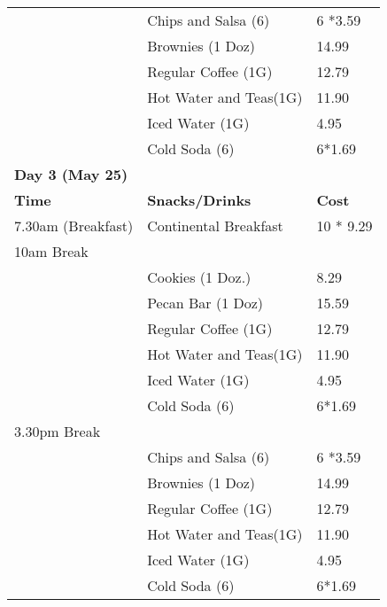 \documentclass[10pt]{article}
\begin{document}
\begin{table}[htp]
{\begin{tabular}{lll}
		&	    Chips and Salsa (6) &   6 *3.59  \\	
	    &			Brownies (1 Doz)  & 14.99 \\
		& 	    Regular Coffee (1G) & 12.79 \\
		& 	    Hot Water and Teas(1G) & 11.90  \\
         &        Iced Water (1G)& 4.95 \\
		& 	    Cold Soda  (6) & 6*1.69	 \\ \hline
\multicolumn{3}{l}{\textbf{Day 3 (May 25)}}\\ \hline
\textbf{Time}  &  \textbf{Snacks/Drinks} & \textbf{Cost} \\ \hline
7.30am (Breakfast)  &    Continental Breakfast  & 10 * 9.29  \\ \hline
10am Break   &    & \\
        &      Cookies (1 Doz.) &  8.29 \\
        &      Pecan Bar (1 Doz)  &  15.59 \\
		&	   Regular Coffee (1G) & 12.79 \\
		&	   Hot Water and Teas(1G) & 11.90 \\ 
        &       Iced Water (1G)& 4.95 \\
		&	   Cold Soda  (6) & 6*1.69	 \\\hline
3.30pm Break &  & \\
		&	    Chips and Salsa (6)  & 6 *3.59 	 \\
		&		Brownies (1 Doz)  & 14.99 \\
		&	    Regular Coffee (1G) & 12.79 \\
		&	    Hot Water and Teas(1G) & 11.90 \\ 
        &        Iced Water (1G)& 4.95 \\
		&	    Cold Soda  (6) & 6*1.69	 \\ \hline
\end{tabular}
}
\end{table}
\end{document}

